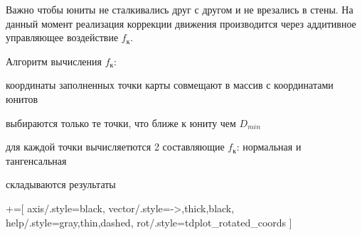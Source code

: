 Важно чтобы юниты не сталкивались друг с другом и не врезались в стены.
На данный момент реализация коррекции движения производится через аддитивное управляющее
воздействие $f_{\text{к}}$. 

Алгоритм вычисления $f_{\text{к}}$:
\begin{mintemize}
\item координаты заполненных точки карты совмещают в массив с координатами юнитов
\item выбираются только те точки, что ближе к юниту чем $D_{min}$
\item для каждой точки вычисляетются 2 составляющие $f_{\text{к}}$: нормальная и тангенсальная
\item складываются результаты
\end{mintemize}

+=[
    axis/.style={black},
    vector/.style={->,thick,black},
    help/.style={gray,thin,dashed},
    rot/.style={tdplot_rotated_coords}
]

